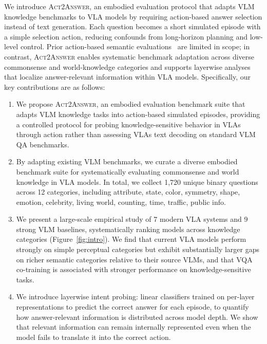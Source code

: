 \documentclass[11pt]{article}
\begin{document}
We introduce \textsc{Act2Answer}, an embodied evaluation protocol that adapts VLM knowledge benchmarks to VLA models by requiring action-based answer selection instead of text generation.
Each question becomes a short simulated episode with a simple selection action, reducing confounds from long-horizon planning and low-level control.
Prior action-based semantic evaluations~\citep{zitkovich2023rt,openvla} are limited in scope; in contrast, \textsc{Act2Answer} enables systematic benchmark adaptation across diverse commonsense and world-knowledge categories and supports layerwise analyses that localize answer-relevant information within VLA models. Specifically, our key contributions are as follows:
\begin{enumerate}
    \item We propose \textsc{Act2Answer}, an embodied evaluation benchmark suite that adapts VLM knowledge tasks into action-based simulated episodes, providing a controlled protocol for probing knowledge-sensitive behavior in VLAs through action rather than assessing VLAs text decoding on standard VLM QA benchmarks.
    
    \item By adapting existing VLM benchmarks, we curate a diverse embodied benchmark suite for systematically evaluating commonsense and world knowledge in VLA models.
    In total, we collect 1,720 unique binary questions across 12 categories, including attribute, state, color, symmetry, shape, emotion, celebrity, living world, counting, time, traffic, public info.
    
    \item We present a large-scale empirical study of 7 modern VLA systems and 9 strong VLM baselines, systematically ranking models across knowledge categories (Figure~\ref{fig:intro}).
    We find that current VLA models perform strongly on simple perceptual categories but exhibit substantially larger gaps on richer semantic categories relative to their source VLMs, and that VQA co-training is associated with stronger performance on knowledge-sensitive tasks.
    
    \item We introduce layerwise intent probing: linear classifiers trained on per-layer representations to predict the correct answer for each episode, to quantify how answer-relevant information is distributed across model depth.
    We show that relevant information can remain internally represented even when the model fails to translate it into the correct action.
\end{enumerate}
\end{document}
